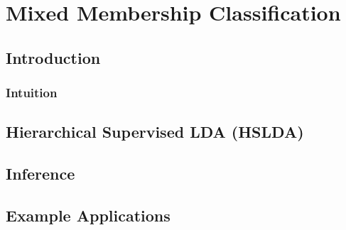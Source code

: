 

\chapter{Mixed Membership Classification}


\section{Introduction}

\label{sec:related_work} 

\subsection{Intuition}

\label{sec:introduction}


\section{Hierarchical Supervised LDA (HSLDA)}
\label{sec:model}


\section{Inference}
\label{sec:inference}




\section{Example Applications}

